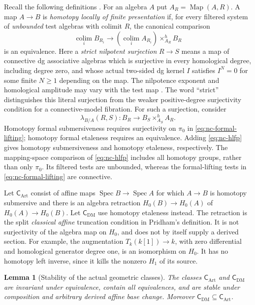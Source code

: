 \documentclass[12pt]{amsart}
\newtheorem{lem}[thm]{Lemma}
\theoremstyle{definition}
\theoremstyle{remark}
\numberwithin{equation}{section}
\DeclareMathOperator{\Map}{Map}
\DeclareMathOperator{\Spec}{Spec}
\begin{document}
Recall the following definitions
\cite[Definitions~1.14, 1.16 and 2.31, pp.~7--8 and
23]{PridhamNC2023}. For an algebra $A$ put $A_R=\Map(A,R)$. A map
$A\to B$ is \emph{homotopy locally of finite presentation} if, for
every filtered system of \emph{unbounded} test algebras with
colimit $R$, the canonical comparison
\begin{equation}\label{eq:nc-hlfp}
 \operatorname*{colim}_i B_{R_i}
 \longrightarrow
 \left(\operatorname*{colim}_i A_{R_i}\right)
       \times^h_{A_R}B_R
\end{equation}
is an equivalence. Here a \emph{strict nilpotent surjection}
$R\to S$ means a map of connective dg associative algebras
which is surjective in every homological degree, including
degree zero, and whose actual two-sided dg kernel $I$
satisfies $I^N=0$ for some finite $N\ge1$ depending on the
map. The nilpotence exponent and homological amplitude
may vary with the test map
\cite[Definition~1.16, p.~8]{PridhamNC2023}.
The word ``strict'' distinguishes this literal surjection
from the weaker positive-degree surjectivity condition for
a connective-model fibration. For such a surjection, consider
\begin{equation}\label{eq:nc-formal-lifting}
 \lambda_{B/A}(R,S):
 B_R\longrightarrow B_S\times^h_{A_S}A_R.
\end{equation}
Homotopy formal submersiveness requires surjectivity on $\pi_0$ in
\eqref{eq:nc-formal-lifting}; homotopy formal etaleness requires an
equivalence. Adding \eqref{eq:nc-hlfp} gives homotopy
submersiveness and homotopy etaleness, respectively. The
mapping-space comparison of \eqref{eq:nc-hlfp} includes all
homotopy groups, rather than only $\pi_0$. Its filtered tests
are unbounded, whereas the formal-lifting
tests in \eqref{eq:nc-formal-lifting} are connective.

Let $\mathsf C_{\mathrm{Art}}$ consist of affine maps
$\Spec B\to\Spec A$ for which $A\to B$ is homotopy submersive
and there is an algebra retraction $H_0(B)\to H_0(A)$ of
$H_0(A)\to H_0(B)$. Let $\mathsf C_{\mathrm{DM}}$ use homotopy
etaleness instead. The retraction is the split
\emph{classical affine} truncation condition in Pridham's
definition. It is not
surjectivity of the algebra map on $H_0$, and does not by itself
supply a derived section. For example, the augmentation
$T_k(k[1])\to k$, with zero differential and homological generator
degree one, is an isomorphism on $H_0$. It has no homotopy left
inverse, since it kills the nonzero $H_1$ of its source.

\begin{lem}[Stability of the actual geometric classes]
\label{lem:nc-geometric-stability}
The classes $\mathsf C_{\mathrm{Art}}$ and
$\mathsf C_{\mathrm{DM}}$ are invariant under equivalence, contain
all equivalences, and are stable under composition and arbitrary
derived affine base change. Moreover
$\mathsf C_{\mathrm{DM}}\subseteq\mathsf C_{\mathrm{Art}}$.
\end{lem}
\end{document}

